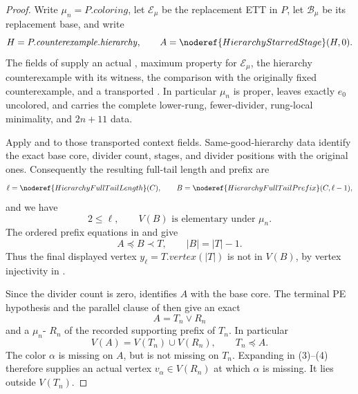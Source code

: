 \begin{proof}
Write \(\mu_n=P.\mathit{coloring}\), let \(\mathcal E_\mu\) be the
replacement ETT in \(P\), let \(\mathcal B_\mu\) be its replacement base,
and write
\[
 H=P.\mathit{counterexample}.\mathit{hierarchy},\qquad
 A=\noderef{HierarchyStarredStage}(H,0).
\]
The fields of  supply an actual
, maximum property for
\(\mathcal E_\mu\), the hierarchy counterexample with its
 witness, the
 comparison with the originally fixed
counterexample, and a transported
.  In particular
\(\mu_n\) is proper, leaves exactly \(e_0\) uncolored, and carries the
complete lower-rung, fewer-divider, rung-local minimality, and \(2n+11\)
data.

Apply  and
 to those transported
context fields.  Same-good-hierarchy data identify the exact base core,
divider count, stages, and divider positions with the original ones.
Consequently the resulting full-tail length and prefix are
\[
 \ell=\noderef{HierarchyFullTailLength}(C),\qquad
 B=\noderef{HierarchyFullTailPrefix}(C,\ell-1),
\]
and we have
\[
        2\leq\ell,\qquad
        V(B)\text{ is elementary under }\mu_n.                 \tag{1}
\]
The ordered prefix equations in  and
 give
\[
 A\preccurlyeq B\prec T,\qquad |B|=|T|-1.                     \tag{2}
\]
Thus the final displayed vertex
\(y_\ell=T.\mathit{vertex}(|T|)\) is not in \(V(B)\), by vertex
injectivity in .

Since the divider count is zero,
 identifies \(A\) with the base core.
The terminal PE hypothesis and the parallel clause of
 then give an exact
\[
                         A=T_n\vee R_n                         \tag{3}
\]
and a \(\mu_n\)- \(R_n\) of the recorded
supporting prefix of \(T_n\).  In particular
\[
 V(A)=V(T_n)\cup V(R_n),\qquad T_n\preccurlyeq A.              \tag{4}
\]
The color \(\alpha\) is missing on \(A\), but is not missing on \(T_n\).
Expanding  in (3)--(4) therefore supplies an
actual vertex \(v_\alpha\in V(R_n)\) at which \(\alpha\) is missing.
It lies outside \(V(T_n)\).


\end{proof}
